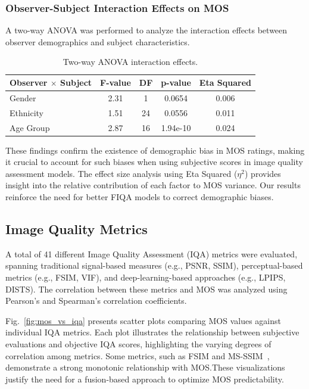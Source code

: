 \subsubsection{Observer-Subject Interaction Effects on MOS}

A two-way ANOVA was performed to analyze the interaction effects between observer demographics and subject characteristics.

\begin{table}[!htbp]
\centering
\caption{Two-way ANOVA interaction effects.}
\begin{tabular}{|l|c|c|c|c|} \hline
\textbf{Observer $\times$ Subject} & \textbf{F-value} & \textbf{DF} & \textbf{p-value} & \textbf{Eta Squared} \\ \hline
Gender & 2.31 & 1 & 0.0654 & 0.006 \\ \hline
Ethnicity & 1.51 & 24 & 0.0556 & 0.011 \\ \hline
Age Group & 2.87 & 16 & 1.94e-10 & 0.024 \\ \hline
\end{tabular}\label{tab:anova_interaction}
\end{table}

These findings confirm the existence of demographic bias in MOS ratings, making it crucial to account for such biases when using subjective scores in image quality assessment models. The effect size analysis using Eta Squared ($\eta^2$) provides insight into the relative contribution of each factor to MOS variance. Our results reinforce the need for better FIQA models to correct demographic biases.

\subsection{Image Quality Metrics}

A total of 41 different Image Quality Assessment (IQA) metrics were evaluated, spanning traditional signal-based measures (e.g., PSNR, SSIM), perceptual-based metrics (e.g., FSIM, VIF), and deep-learning-based approaches (e.g., LPIPS, DISTS). The correlation between these metrics and MOS was analyzed using Pearson’s and Spearman’s correlation coefficients. 

Fig.~\ref{fig:mos_vs_iqa} presents scatter plots comparing MOS values against individual IQA metrics. Each plot illustrates the relationship between subjective evaluations and objective IQA scores, highlighting the varying degrees of correlation among metrics. Some metrics, such as FSIM and MS-SSIM~\cite{wang2003multiscale}, demonstrate a strong monotonic relationship with MOS.\@ These visualizations justify the need for a fusion-based approach to optimize MOS predictability.



